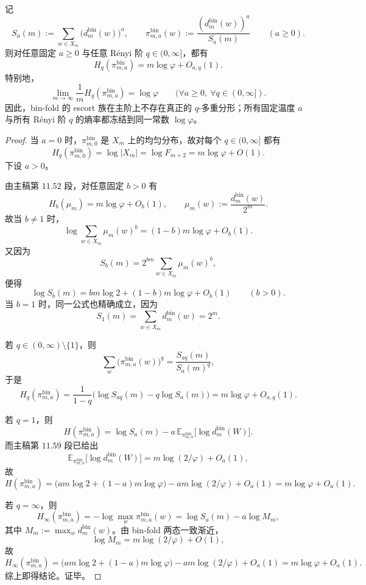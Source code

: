 \begin{theorem}\label{thm:conclusion-binfold-escort-all-renyi-rate-freezing}
记
\[
S_a(m):=\sum_{w\in X_m}\bigl(d_m^{\mathrm{bin}}(w)\bigr)^a,
\qquad
\pi_{m,a}^{\mathrm{bin}}(w):=\frac{(d_m^{\mathrm{bin}}(w))^a}{S_a(m)}
\qquad (a\ge 0).
\]
则对任意固定 \(a\ge 0\) 与任意 Rényi 阶 \(q\in(0,\infty]\)，都有
\[
H_q(\pi_{m,a}^{\mathrm{bin}})=m\log\varphi+O_{a,q}(1).
\]
特别地，
\[
\lim_{m\to\infty}\frac1m H_q(\pi_{m,a}^{\mathrm{bin}})=\log\varphi
\qquad (\forall a\ge0,\ \forall q\in(0,\infty]).
\]
因此，bin-fold 的 escort 族在主阶上不存在真正的 \(q\)-多重分形；所有固定温度 \(a\) 与所有 Rényi 阶 \(q\) 的熵率都冻结到同一常数 \(\log\varphi\)。
\end{theorem}
\begin{proof}
当 \(a=0\) 时，\(\pi_{m,0}^{\mathrm{bin}}\) 是 \(X_m\) 上的均匀分布，故对每个 \(q\in(0,\infty]\) 都有
\[
H_q(\pi_{m,0}^{\mathrm{bin}})=\log|X_m|=\log F_{m+2}=m\log\varphi+O(1).
\]
下设 \(a>0\)。

由主稿第 \(11.52\) 段，对任意固定 \(b>0\) 有
\[
H_b(\mu_m)=m\log\varphi+O_b(1),
\qquad
\mu_m(w):=\frac{d_m^{\mathrm{bin}}(w)}{2^m}.
\]
故当 \(b\neq 1\) 时，
\[
\log\sum_{w\in X_m}\mu_m(w)^b=(1-b)m\log\varphi+O_b(1).
\]
又因为
\[
S_b(m)=2^{bm}\sum_{w\in X_m}\mu_m(w)^b,
\]
便得
\[
\log S_b(m)=bm\log2+(1-b)m\log\varphi+O_b(1)
\qquad (b>0).
\]
当 \(b=1\) 时，同一公式也精确成立，因为
\[
S_1(m)=\sum_{w\in X_m}d_m^{\mathrm{bin}}(w)=2^m.
\]

若 \(q\in(0,\infty)\setminus\{1\}\)，则
\[
\sum_w \bigl(\pi_{m,a}^{\mathrm{bin}}(w)\bigr)^q
=
\frac{S_{aq}(m)}{S_a(m)^q},
\]
于是
\[
H_q(\pi_{m,a}^{\mathrm{bin}})
=
\frac{1}{1-q}\bigl(\log S_{aq}(m)-q\log S_a(m)\bigr)
=
m\log\varphi+O_{a,q}(1).
\]

若 \(q=1\)，则
\[
H(\pi_{m,a}^{\mathrm{bin}})
=
\log S_a(m)-a\,\mathbb E_{\pi_{m,a}^{\mathrm{bin}}}\!\bigl[\log d_m^{\mathrm{bin}}(W)\bigr].
\]
而主稿第 \(11.59\) 段已给出
\[
\mathbb E_{\pi_{m,a}^{\mathrm{bin}}}\!\bigl[\log d_m^{\mathrm{bin}}(W)\bigr]
=
m\log(2/\varphi)+O_a(1),
\]
故
\[
H(\pi_{m,a}^{\mathrm{bin}})
=
\bigl(am\log2+(1-a)m\log\varphi\bigr)-am\log(2/\varphi)+O_a(1)
=
m\log\varphi+O_a(1).
\]

若 \(q=\infty\)，则
\[
H_\infty(\pi_{m,a}^{\mathrm{bin}})
=
-\log \max_w \pi_{m,a}^{\mathrm{bin}}(w)
=
\log S_a(m)-a\log M_m,
\]
其中 \(M_m:=\max_w d_m^{\mathrm{bin}}(w)\)。由 bin-fold 两态一致渐近，
\[
\log M_m=m\log(2/\varphi)+O(1),
\]
故
\[
H_\infty(\pi_{m,a}^{\mathrm{bin}})
=
\bigl(am\log2+(1-a)m\log\varphi\bigr)-am\log(2/\varphi)+O_a(1)
=
m\log\varphi+O_a(1).
\]
综上即得结论。证毕。
\end{proof}

